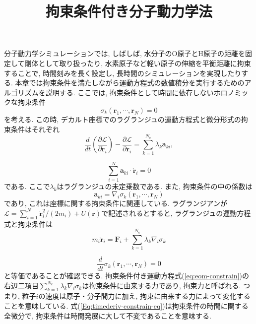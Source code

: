 





\title{拘束条件付き分子動力学法}
\maketitle

分子動力学シミュレーションでは, しばしば, 水分子のO原子とH原子の距離を固定して剛体として取り扱ったり, 水素原子など軽い原子の伸縮を平衡距離に拘束することで, 時間刻みを長く設定し, 長時間のシミュレーションを実現したりする. 
本章では拘束条件を満たしながら運動方程式の数値積分を実行するためのアルゴリズムを説明する. 
ここでは, 拘束条件として時間に依存しないホロノミックな拘束条件
\begin{equation}
    \sigma_{k} (\bm{r}_{1},\cdots, \bm{r}_{N}) = 0
\end{equation}
を考える. 
この時, デカルト座標でのラグランジュの運動方程式と微分形式の拘束条件はそれぞれ
\begin{equation}
    \frac{d}{dt} \left(\frac{\partial \mathcal{L}}{\partial \dot{\bm{r}}_{i}} \right) -\frac{\partial \mathcal{L}}{\partial \bm{r}_{i}} = \sum_{k=1}^{N_{\mathrm{c}}} \lambda_{k} \bm{a}_{ki},
\end{equation}

\begin{equation}
    \sum_{i=1}^{N} \bm{a}_{ki} \cdot \dot{\bm{r}}_{i} = 0
    \label{Eq:constrain-eq}
\end{equation}
である. 
ここで$\lambda_{k}$はラグランジュの未定乗数である. また, 拘束条件の中の係数は
\begin{equation}
    \bm{a}_{ki} = \nabla_{i} \sigma_{k} (\bm{r}_{1}, \cdots, \bm{r}_{N})
    \label{Eq:constrain-eq-position}
\end{equation}
であり, これは座標に関する拘束条件に関連している. 
ラグランジアンが$\mathcal{L}=\sum_{i=1}^{N} \dot{\bm{r}}_{i}^{2}/(2m_{i}) + U(\bm{r})$で記述されるとすると, ラグランジュの運動方程式と拘束条件は
\begin{equation}
    m_{i} \ddot{\bm{r}}_{i}
    =
    \bm{F}_{i} + \sum_{k=1}^{N_{\mathrm{c}}} \lambda_{k} \nabla_{i} \sigma_{k}
    \label{eq:eom-constrain}
\end{equation}

\begin{equation}
    \frac{d}{dt} \sigma_{k} (\bm{r}_{1},\cdots, \bm{r}_{N}) = 0
    \label{Eq:timederiv-constrain-eq}
\end{equation}
と等価であることが確認できる. 拘束条件付き運動方程式(\ref{eq:eom-constrain})の右辺二項目$\sum_{k=1}^{N_{\mathrm{c}}} \lambda_{k} \nabla_{i} \sigma_{k}$は拘束条件に由来する力であり, 拘束力と呼ばれる. つまり, 粒子$i$の速度は原子・分子間力に加え, 拘束に由来する力によって変化することを意味している. 
式(\ref{Eq:timederiv-constrain-eq})は拘束条件の時間に関する全微分で, 拘束条件は時間発展に大して不変であることを意味する. 


